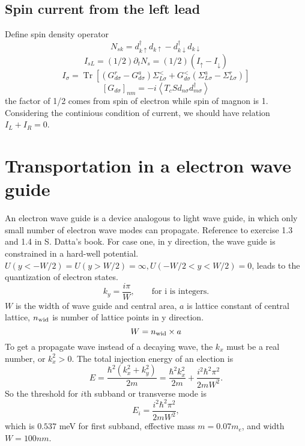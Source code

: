 \documentclass[11pt,a4paper]{article}
\begin{document}
\subsection{Spin current from the left lead}
Define spin density operator
\begin{equation}
N_{sk} = d_{k \uparrow}^{\dagger} d_{k \uparrow}-d_{k \downarrow}^{\dagger} d_{k \downarrow}
\end{equation}
\begin{equation}
I_{s L}=(1 / 2) \partial_{t} N_{s}=(1 / 2)\left(I_{\uparrow}-I_{\downarrow}\right)
\end{equation}
\begin{equation}
I_{\sigma}=\operatorname{Tr}\left[\left(G_{d \sigma}^{r}-G_{d \sigma}^{a}\right) \Sigma_{L \sigma}^{<}+G_{d \sigma}^{<}\left(\Sigma_{L \sigma}^{a}-\Sigma_{L \sigma}^{r}\right)\right]
\end{equation}
\begin{equation}
\left[G_{d \sigma}\right]_{n m}=-i\left\langle T_{c} S d_{n \sigma} d_{m \sigma}^{\dagger}\right\rangle
\end{equation}
the factor of 1/2 comes from spin of electron while spin of magnon is 1. Considering the continious condition of current, we should have relation $I_{L} + I_{R} = 0$.
\section{Transportation in a electron wave guide}
An electron wave guide is a device analogous to light wave guide, in which only small number of electron wave modes can propagate. Reference to exercise 1.3 and 1.4 in S. Datta's book. For case one, in y direction, the wave guide is constrained in a hard-well potential. $U(y < -W/2) = U(y > W/2) = \infty, U(-W/2 < y < W/2) = 0$, leads to the quantization of electron states.
\begin{equation}
k_{y} = \frac{i\pi}{W}, \qquad \text{for i is integers.}
\end{equation}
$W$ is the width of wave guide and central area, $a$ is lattice constant of central lattice, $n_{\rm{wid}}$ is number of lattice points in y direction.
\begin{equation}
W = n_{\rm{wid}}\times a
\end{equation}
To get a propagate wave instead of a decaying wave, the $k_{x}$ must be a real number, or $k_{x}^{2} > 0$. The total injection energy of an election is
\begin{equation}
E = \frac{\hbar^{2} (k_{x}^{2}+k_{y}^{2})}{2m} = \frac{\hbar^{2} k_{x}^{2}}{2m} + \frac{i^{2}\hbar^{2} \pi^{2}}{2mW^{2}}.
\end{equation}
So the threshold for $i$th subband or transverse mode is
\begin{equation}
E_{i} = \frac{i^{2}\hbar^{2} \pi^{2}}{2mW^{2}},
\end{equation}
which is $0.537$ meV for first subband, effective mass $m=0.07m_{e}$, and width $W = 100nm$.
\end{document}
